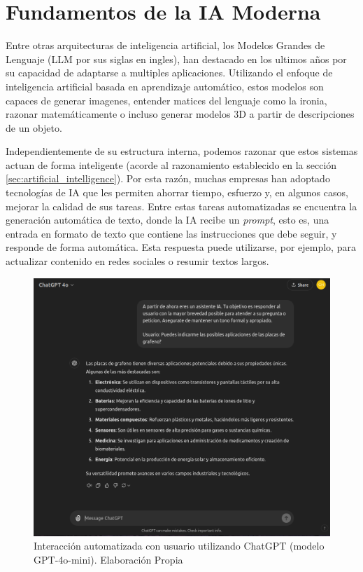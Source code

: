 \section{Fundamentos de la IA Moderna}

Entre otras arquitecturas de inteligencia artificial, los Modelos Grandes de
Lenguaje (LLM por sus siglas en ingles), han destacado en los ultimos años por
su capacidad de adaptarse a multiples aplicaciones. Utilizando el enfoque de
inteligencia artificial basada en aprendizaje automático, estos modelos son
capaces de generar imagenes, entender matices del lenguaje como la ironia,
razonar matemáticamente o incluso generar modelos 3D a partir de descripciones
de un objeto.

Independientemente de su estructura interna, podemos razonar que estos sistemas
actuan de forma inteligente (acorde al razonamiento establecido en la sección
\ref{sec:artificial_intelligence}). Por esta razón, muchas empresas han adoptado
tecnologías de IA que les permiten ahorrar tiempo, esfuerzo y, en algunos casos,
mejorar la calidad de sus tareas. Entre estas tareas automatizadas se encuentra
la generación automática de texto, donde la IA recibe un \textit{prompt}, esto
es, una entrada en formato de texto que contiene las instrucciones que debe
seguir, y responde de forma automática. Esta respuesta puede utilizarse, por
ejemplo, para actualizar contenido en redes sociales o resumir textos largos.

\begin{figure}[!hbp]
	\centering
	\includegraphics[scale=0.3]{figs/chatgpt.png}
	\caption{\small Interacción automatizada con usuario utilizando ChatGPT (modelo GPT-4o-mini). Elaboración Propia}
	\label{fig:etiqueta}
\end{figure}

